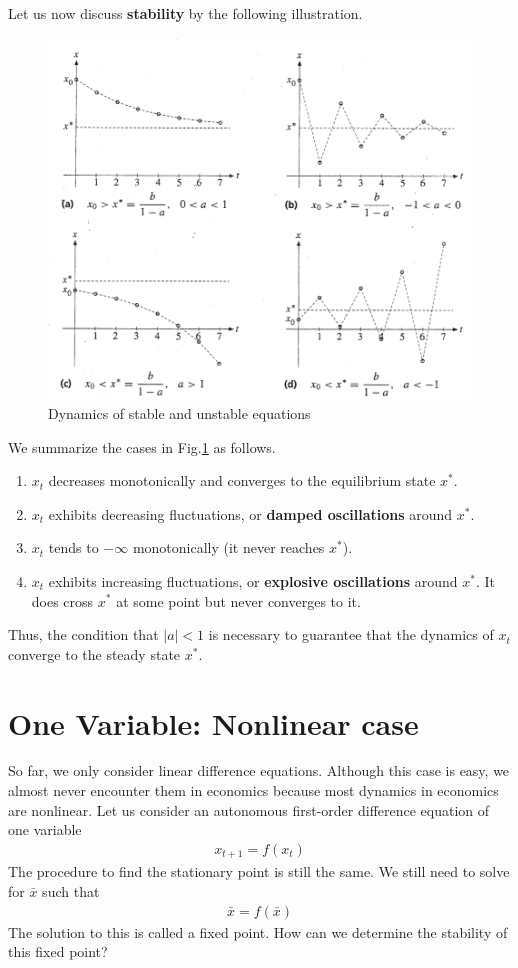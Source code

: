 \documentclass[11pt,a4paper]{book}
\theoremstyle{definition}\newtheorem{definition}{Definition}
\theoremstyle{definition}\newtheorem{fact}{Fact}
\theoremstyle{definition}\newtheorem{remark}{Remark}
\theoremstyle{definition}\newtheorem{ex}{Ex.}
\theoremstyle{definition}\newtheorem{project}{Project}
\theoremstyle{definition}\newtheorem{problem}{Problem}
\theoremstyle{definition}\newtheorem{example}{Example}
\numberwithin{theorem}{section}
\numberwithin{corollary}{chapter}
\numberwithin{assumption}{chapter}
\numberwithin{definition}{chapter}
\numberwithin{prop}{chapter}
\numberwithin{notation}{chapter}
\numberwithin{problem}{chapter}
\numberwithin{example}{chapter}
\numberwithin{fact}{chapter}
\numberwithin{ex}{chapter}
\begin{document}
	Let us now discuss \textbf{stability} by the following illustration.
	\begin{figure}[H]
		\centering
		\includegraphics[scale=0.35]{figs/page393.png}
		\caption{Dynamics of stable and unstable equations \citep[p.393]{sydsaeter2008further} } 
		\label{fig:stablity}
	\end{figure}
	
	We summarize the cases in Fig.\ref{fig:stablity} as follows.
	\begin{enumerate}[label=(\alph*)]
		\item $x_t$ decreases monotonically and converges to the equilibrium state $x^*$.
		\item $x_t$ exhibits decreasing fluctuations, or \textbf{damped oscillations} around $x^*$.
		\item $x_t$ tends to $-\infty$ monotonically (it never reaches $x^*$).
		\item $x_t$ exhibits increasing fluctuations, or \textbf{explosive oscillations} around $x^*$. It does cross $x^*$ at some point but never converges to it.
	\end{enumerate}
	Thus, the condition that $|a| < 1$ is necessary to guarantee that the dynamics of $x_t$ converge to the steady state $x^*$.
	
	\section{One Variable: Nonlinear case}
	So far, we only consider linear difference equations. Although this case is easy, we almost never encounter them in economics because most dynamics in economics are nonlinear. Let us consider an autonomous first-order difference equation of one variable
	\begin{align}
		x_{t+1} = f(x_t) \label{nonlin}
	\end{align}
	The procedure to find the stationary point is still the same. We still need to solve for $\bar{x}$ such that
	\begin{align*}
		\bar{x} = f(\bar{x})
	\end{align*}
	The solution to this is called a fixed point. How can we determine the stability of this fixed point? 
	
\end{document}

